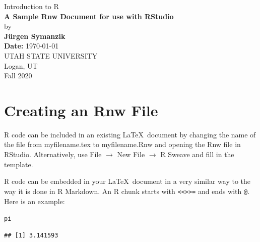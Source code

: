 \documentclass[12pt]{article}\usepackage[]{graphicx}\usepackage[]{xcolor}
\makeatletter
\newcommand{\hlstd}[1]{\textcolor[rgb]{0.345,0.345,0.345}{#1}}%
\newenvironment{kframe}{%
 \def\at@end@of@kframe{}%
 \ifinner\ifhmode%
  \def\at@end@of@kframe{\end{minipage}}%
  \begin{minipage}{\columnwidth}%
 \fi\fi%
 \def\FrameCommand##1{\hskip\@totalleftmargin \hskip-\fboxsep
 \colorbox{shadecolor}{##1}\hskip-\fboxsep
     \hskip-\linewidth \hskip-\@totalleftmargin \hskip\columnwidth}%
 \MakeFramed {\advance\hsize-\width
   \@totalleftmargin\z@ \linewidth\hsize
   \@setminipage}}%
 {\par\unskip\endMakeFramed%
 \at@end@of@kframe}
\newenvironment{knitrout}{}{} %
\makeatother
\begin{document}
\begin{titlepage}

\begin{center}
{\large Introduction to R} \\[1.5in]

{\LARGE \bf A Sample Rnw Document for use with RStudio} \\[.4in]
by \\[.4in]
{\bf J\"urgen Symanzik} \\[1in]
{\bf Date:} \today \\[.8in]

UTAH STATE UNIVERSITY \\[.2in]
Logan, UT \\[0.2in]
Fall 2020 \\[0.2in]
\end{center}

\thispagestyle{empty}
\vfill
\end{titlepage}


\newpage 


\tableofcontents


\newpage


\section{Creating an Rnw File}

R \cite{R} code can be included in an existing \LaTeX\ document by changing the name of the file from myfilename.tex to myfilename.Rnw and opening the Rnw file in RStudio.  Alternatively, use File $\rightarrow$ New File $\rightarrow$ R Sweave and fill in the template. 

R code can be embedded in your \LaTeX\ document in a very similar way to the way it is done in R Markdown. An R chunk starts with \verb|<<>>=| and  ends with \verb|@|.
Here is an example:

\begin{knitrout}
\color{fgcolor}\begin{kframe}
\begin{alltt}
\hlstd{pi}
\end{alltt}
\begin{verbatim}
## [1] 3.141593
\end{verbatim}
\end{kframe}
\end{knitrout}
\end{document}
